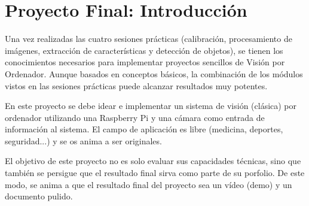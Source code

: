 \chapter{Proyecto Final: \textbf{Introducción}}
\label{chapter:introduction_lab_project}

Una vez realizadas las cuatro sesiones prácticas (calibración, procesamiento de imágenes, extracción de características y detección de objetos), se tienen los conocimientos necesarios para implementar proyectos sencillos de Visión por Ordenador. Aunque basados en conceptos básicos, la combinación de los módulos vistos en las sesiones prácticas puede alcanzar resultados muy potentes. 

En este proyecto se debe idear e implementar un sistema de visión (clásica) por ordenador utilizando una Raspberry Pi y una cámara como entrada de información al sistema. El campo de aplicación es libre (medicina, deportes, seguridad...) y se os anima a ser originales. 

El objetivo de este proyecto no es solo evaluar sus capacidades técnicas, sino que también se persigue que el resultado final sirva como parte de su porfolio. De este modo, se anima a que el resultado final del proyecto sea un vídeo (demo) y un documento pulido.
